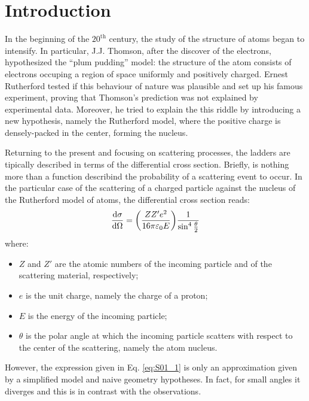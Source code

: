 \documentclass[../../main/main.tex]{subfiles}
\begin{document}
\section{Introduction}

In the beginning of the \( 20^{\text{th}} \) century, the study of the structure of atoms began to intensify. In particular, J.J. Thomson, after the discover of the electrons, hypothesized the ``plum pudding'' model: the structure of the atom consists of electrons occuping a region of space uniformly and positively charged. Ernest Rutherford tested if this behaviour of nature was plausible and set up his famous experiment, proving that Thomson's prediction was not explained by experimental data. Moreover, he tried to explain the this riddle by introducing a new hypothesis, namely the Rutherford model, where the positive charge is densely-packed in the center, forming the nucleus.

Returning to the present and focusing on scattering processes, the ladders are tipically described in terms of the differential cross section. Briefly, is nothing more than a function describind the probability of a scattering event to occur. In the particular case of the scattering of a charged particle against the nucleus of the Rutherford model of atoms, the differential cross section reads:
\begin{equation}
    \dv{\sigma}{\Omega}
    =
    \qty(\frac{ZZ'e^{2}}{16\pi \varepsilon_{0} E}) \frac{1}{\sin^4\frac{\theta}{2}}
    \label{eq:S01_1}
\end{equation}
where:
\begin{itemize}
    \item \( Z \) and \( Z' \) are the atomic numbers of the incoming particle and of the scattering material, respectively;
    \item \( e \) is the unit charge, namely the charge of a proton;
    \item \( E \) is the energy of the incoming particle;
    \item \( \theta \) is the polar angle at which the incoming particle scatters with respect to the center of the scattering, namely the atom nucleus.
\end{itemize}
However, the expression given in Eq. \ref{eq:S01_1} is only an approximation given by a simplified model and naive geometry hypotheses. In fact, for small angles it diverges and this is in contrast with the observations.
\end{document}
